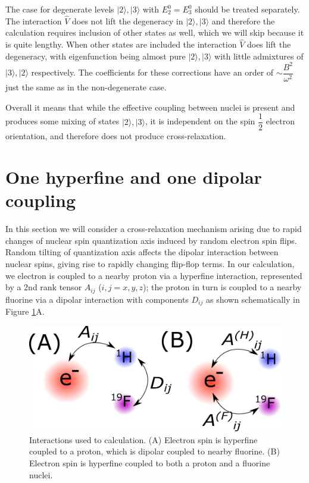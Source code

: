 \documentclass[a4paper, 12pt]{article}
\begin{document}
The case for degenerate levels $\vert 2 \rangle, \vert 3 \rangle$ with $E_2^0 = E_3^0$ should be treated separately. The interaction $\hat{V}$ does not lift the degeneracy in $\vert 2 \rangle, \vert 3 \rangle$ and therefore the calculation requires inclusion of other states as well, which we will skip  because it is quite lengthy. When other states are included the interaction $\hat{V}$ does lift the degeneracy, with eigenfunction being almost pure $\vert 2 \rangle, \vert 3 \rangle$ with little admixtures of $\vert 3 \rangle, \vert 2 \rangle$ respectively. The coefficients for these corrections have an order of $ \sim \dfrac{B^2}{\omega^2}$ just the same as in the non-degenerate case. 

Overall it means that while the effective coupling between nuclei is present and produces some  mixing of states $\vert 2 \rangle, \vert 3 \rangle$, it is independent on the spin $\dfrac{1}{2}$ electron orientation, and therefore does not produce cross-relaxation.




\section{One hyperfine and one dipolar coupling} \label{sec: case A}
In this section we will consider a cross-relaxation mechanism arising due to rapid changes of nuclear spin quantization axis induced by random electron spin flips. Random tilting of quantization axis affects the dipolar interaction between nuclear spins, giving rise to rapidly changing flip-flop terms.
In our calculation, we electron is coupled to a nearby proton via a hyperfine interaction, represented by a 2nd rank tensor $A_{ij}$ ($i,j=x,y,z$); the proton in turn is coupled to a nearby fluorine via a dipolar interaction with components $D_{ij}$ as shown schematically in Figure \ref{fig:coupling}A.

\begin{figure}[b]
	\caption{Interactions used to calculation. (A) Electron spin is hyperfine coupled to a proton, which is dipolar coupled to nearby fluorine. (B) Electron spin is hyperfine coupled to both a proton and a fluorine nuclei.}
	\label{fig:coupling}
	\centering
	\includegraphics[scale=0.7]{text9330-7-6-8.png}
\end{figure}
\end{document}
